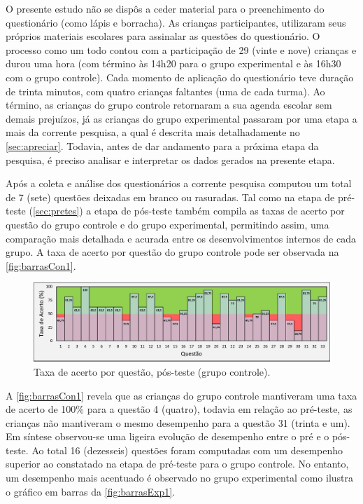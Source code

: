 O presente estudo não se dispôs a ceder material para o preenchimento do questionário (como lápis e borracha). As crianças participantes, utilizaram seus próprios materiais escolares para assinalar as questões do questionário. O processo como um todo contou com a participação de 29 (vinte e nove) crianças e durou uma hora (com término às 14h20 para o grupo experimental e às 16h30 com o grupo controle). Cada momento de aplicação do questionário teve duração de trinta minutos, com quatro crianças faltantes (uma de cada turma). Ao término, as crianças do grupo controle retornaram a sua agenda escolar sem demais prejuízos, já as crianças do grupo experimental passaram por uma etapa a mais da corrente pesquisa, a qual é descrita mais detalhadamente no \autoref{sec:apreciar}. Todavia, antes de dar andamento para a próxima etapa da pesquisa, é preciso analisar e interpretar os dados gerados na presente etapa. 

Após a coleta e análise dos questionários a corrente pesquisa computou um total de 7 (sete) questões deixadas em branco ou rasuradas. Tal como na etapa de pré-teste (\autoref{sec:pretes}) a etapa de pós-teste também compila as taxas de acerto por questão do grupo controle e do grupo experimental, permitindo assim, uma comparação mais detalhada e acurada entre os desenvolvimentos internos de cada grupo. A taxa de acerto por questão do grupo controle pode ser observada na  \autoref{fig:barrasCon1}.


\begin{figure}[htb]

    \caption{\label{fig:barrasCon1}Taxa de acerto por questão, pós-teste (grupo controle).}
    \includegraphics[width=\linewidth]{./Visuais/NotasControlePOS.pdf}
  
\end{figure}

A \autoref{fig:barrasCon1} revela que as crianças do grupo controle mantiveram uma taxa de acerto de 100\% para a questão 4 (quatro), todavia em relação ao pré-teste, as crianças não mantiveram o mesmo desempenho para a questão 31 (trinta e um). Em síntese observou-se uma ligeira evolução de desempenho entre o pré e o pós-teste. Ao total 16 (dezesseis) questões foram computadas com um desempenho superior ao constatado na etapa de pré-teste para o grupo controle. 
No entanto, um desempenho mais acentuado é observado no grupo experimental como ilustra o gráfico em barras da \autoref{fig:barrasExp1}.


